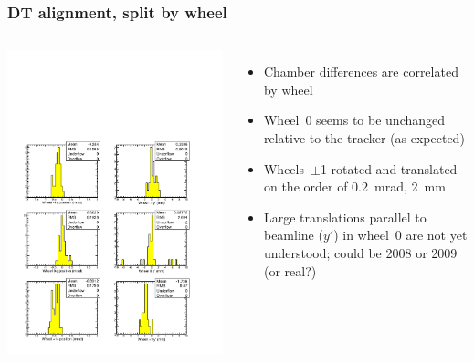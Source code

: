 \documentclass[compress]{beamer}
\begin{document}
\begin{frame}
\frametitle{DT alignment, split by wheel}

\begin{columns}
\includegraphics[width=\linewidth]{phipos_yprime_2008_2009.pdf}

\begin{itemize}
\item Chamber differences are correlated by wheel
\item Wheel~0 seems to be unchanged relative to the tracker (as
  expected)
\item Wheels~$\pm$1 rotated and translated on the order of 0.2~mrad,
  2~mm
\item Large translations parallel to beamline ($y'$) in wheel~0 are
  not yet understood; could be 2008 or 2009 (or real?)
\end{itemize}
\end{columns}
\end{frame}
\end{document}
